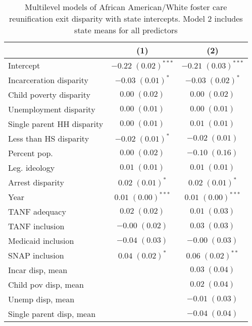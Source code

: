 
\begin{table}
\caption{Multilevel models of African American/White foster care reunification exit disparity with state intercepts. Model 2 includes state means for all predictors }
\begin{center}
\begin{tabular}{l c c }
\hline
 & (1) & (2) \\
\hline
Intercept                  & $-0.22 \; (0.02)^{***}$ & $-0.21 \; (0.03)^{***}$ \\
Incarceration disparity    & $-0.03 \; (0.01)^{*}$   & $-0.03 \; (0.02)^{*}$   \\
Child poverty disparity    & $0.00 \; (0.02)$        & $0.00 \; (0.02)$        \\
Unemployment disparity     & $0.00 \; (0.01)$        & $0.00 \; (0.01)$        \\
Single parent HH disparity & $0.00 \; (0.01)$        & $0.01 \; (0.01)$        \\
Less than HS disparity     & $-0.02 \; (0.01)^{*}$   & $-0.02 \; (0.01)$       \\
Percent pop.               & $0.00 \; (0.02)$        & $-0.10 \; (0.16)$       \\
Leg. ideology              & $0.01 \; (0.01)$        & $0.01 \; (0.01)$        \\
Arrest disparity           & $0.02 \; (0.01)^{*}$    & $0.02 \; (0.01)^{*}$    \\
Year                       & $0.01 \; (0.00)^{***}$  & $0.01 \; (0.00)^{***}$  \\
TANF adequacy              & $0.02 \; (0.02)$        & $0.01 \; (0.03)$        \\
TANF inclusion             & $-0.00 \; (0.02)$       & $0.03 \; (0.03)$        \\
Medicaid inclusion         & $-0.04 \; (0.03)$       & $-0.00 \; (0.03)$       \\
SNAP inclusion             & $0.04 \; (0.02)^{*}$    & $0.06 \; (0.02)^{**}$   \\
Incar disp, mean           &                         & $0.03 \; (0.04)$        \\
Child pov disp, mean       &                         & $0.02 \; (0.04)$        \\
Unemp disp, mean           &                         & $-0.01 \; (0.03)$       \\
Single parent disp, mean   &                         & $-0.04 \; (0.04)$       \\

\end{tabular}
\end{center}
\end{table}

